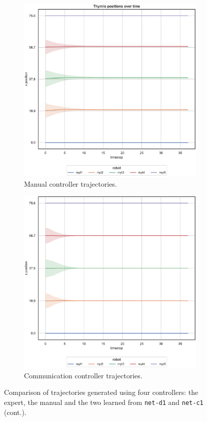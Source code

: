 \begin{figure}\ContinuedFloat
	\begin{center}
		\begin{subfigure}[h]{0.49\textwidth}
			\centering			
			\includegraphics[width=.9\textwidth]{contents/images/net-d1/position-overtime-manual}%
			\caption{Manual controller trajectories.}
		\end{subfigure}
		\hfill
		\begin{subfigure}[h]{0.49\textwidth}
			\centering
			\includegraphics[width=.9\textwidth]{contents/images/net-c1/position-overtime-learned_communication}
			\caption{Communication controller trajectories.}
		\end{subfigure}
	\end{center}
	\vspace{-0.5cm}
	\caption[]{Comparison 
	of trajectories generated using four controllers: the expert, the manual and the 
	two learned from \texttt{net-d1} and \texttt{net-c1} (cont.).}
	\label{fig:net-c1traj}
\end{figure}


